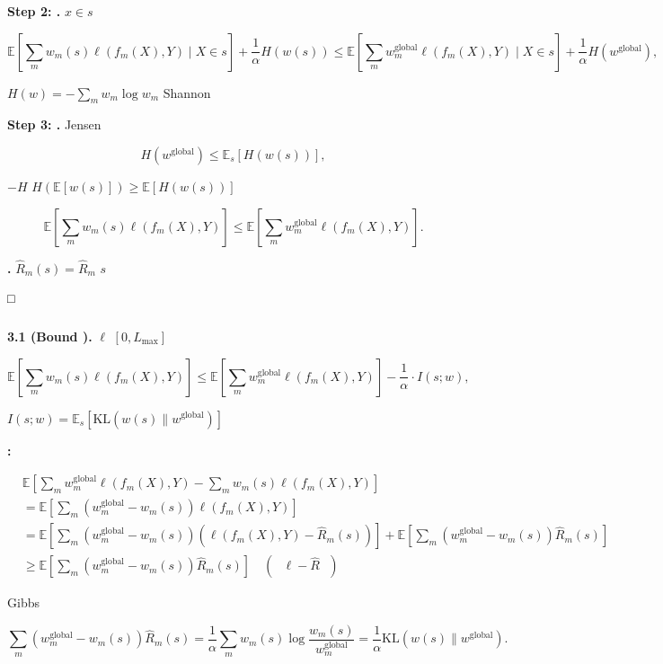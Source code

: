 \documentclass[
  12pt,
]{article}
\begin{document}
\textbf{Step 2: .}  \(x \in s\)

\[\mathbb{E}\left[\sum_m w_m(s) \ell(f_m(X), Y) \mid X \in s\right] + \frac{1}{\alpha} H(w(s)) \leq \mathbb{E}\left[\sum_m w_m^{\text{global}} \ell(f_m(X), Y) \mid X \in s\right] + \frac{1}{\alpha} H(w^{\text{global}}),\]

 \(H(w) = -\sum_m w_m \log w_m\)  Shannon 

\textbf{Step 3: .}  Jensen


\[H(w^{\text{global}}) \leq \mathbb{E}_{s}[H(w(s))],\]

 \(-H\)
\(H(\mathbb{E}[w(s)]) \geq \mathbb{E}[H(w(s))]\)

\[\mathbb{E}\left[\sum_m w_m(s) \ell(f_m(X), Y) \right] \leq \mathbb{E}\left[\sum_m w_m^{\text{global}} \ell(f_m(X), Y) \right].\]

\textbf{.} 
\(\hat{R}_m(s) = \hat{R}_m\)  \(s\)


□

\subsubsection{}\label{ux98ceux9669ux5ea6ux91cfux8ba8ux8bba}

\textbf{ 3.1 (Bound ).}  \(\ell\) 
\([0, L_{\max}]\)

\[\mathbb{E}\left[\sum_m w_m(s) \ell(f_m(X), Y)\right] \leq \mathbb{E}\left[\sum_m w_m^{\text{global}} \ell(f_m(X), Y)\right] - \frac{1}{\alpha} \cdot I(s; w),\]

 \(I(s; w) = \mathbb{E}_s[\text{KL}(w(s) \| w^{\text{global}})]\)


\textbf{:}

\[\begin{aligned}
&\mathbb{E}\left[\sum_m w_m^{\text{global}} \ell(f_m(X), Y) - \sum_m w_m(s) \ell(f_m(X), Y)\right] \\
&= \mathbb{E}\left[\sum_m (w_m^{\text{global}} - w_m(s)) \ell(f_m(X), Y)\right] \\
&= \mathbb{E}\left[\sum_m (w_m^{\text{global}} - w_m(s)) (\ell(f_m(X), Y) - \hat{R}_m(s))\right] + \mathbb{E}\left[\sum_m (w_m^{\text{global}} - w_m(s)) \hat{R}_m(s)\right] \\
&\geq \mathbb{E}\left[\sum_m (w_m^{\text{global}} - w_m(s)) \hat{R}_m(s)\right] \quad (\text{ $\ell - \hat{R}$ })
\end{aligned}\]

 Gibbs 

\[\sum_m (w_m^{\text{global}} - w_m(s)) \hat{R}_m(s) = \frac{1}{\alpha} \sum_m w_m(s) \log \frac{w_m(s)}{w_m^{\text{global}}} = \frac{1}{\alpha} \text{KL}(w(s) \| w^{\text{global}}).\]
\end{document}
